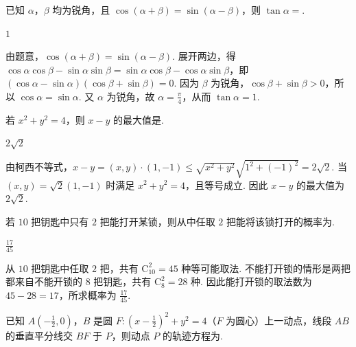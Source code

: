 \begin{problem}
已知 \(\alpha\)，\(\beta\) 均为锐角，且 \(\cos (\alpha + \beta) = \sin (\alpha - \beta)\)，则 \(\tan \alpha = \)\fillinblank{}.
\end{problem}

\begin{answer}
\(1\)
\end{answer}

\begin{solution}
由题意，\(\cos(\alpha+\beta)=\sin(\alpha-\beta)\). 展开两边，得 \(\cos\alpha\cos\beta-\sin\alpha\sin\beta=\sin\alpha\cos\beta-\cos\alpha\sin\beta\)，即 \((\cos\alpha-\sin\alpha)(\cos\beta+\sin\beta)=0\). 因为 \(\beta\) 为锐角，\(\cos\beta+\sin\beta>0\)，所以 \(\cos\alpha=\sin\alpha\). 又 \(\alpha\) 为锐角，故 \(\alpha=\frac\pi4\)，从而 \(\tan\alpha=1\).
\end{solution}

\begin{problem}
若 \(x^{2} + y^{2} = 4\)，则 \(x - y\) 的最大值是\fillinblank{}.
\end{problem}

\begin{answer}
\(2\sqrt{2}\)
\end{answer}

\begin{solution}
由柯西不等式，\(x-y=(x,y)\cdot(1,-1)\leqslant\sqrt{x^2+y^2}\sqrt{1^2+(-1)^2}=2\sqrt{2}\). 当 \((x,y)=\sqrt{2}(1,-1)\) 时满足 \(x^2+y^2=4\)，且等号成立. 因此 \(x-y\) 的最大值为 \(2\sqrt{2}\).
\end{solution}

\begin{problem}
若 \(10\) 把钥匙中只有 \(2\) 把能打开某锁，则从中任取 \(2\) 把能将该锁打开的概率为\fillinblank{}.
\end{problem}

\begin{answer}
\(\frac{17}{45}\)
\end{answer}

\begin{solution}
从 \(10\) 把钥匙中任取 \(2\) 把，共有 \(\mathrm C_{10}^2=45\) 种等可能取法. 不能打开锁的情形是两把都来自不能开锁的 \(8\) 把钥匙，共有 \(\mathrm C_8^2=28\) 种. 因此能打开锁的取法数为 \(45-28=17\)，所求概率为 \(\frac{17}{45}\).
\end{solution}

\begin{problem}
已知 \(A\left(-\frac{1}{2},0\right)\)，\(B\) 是圆 \(F:\left(x - \frac{1}{2}\right)^2 + y^2 = 4\)（\(F\) 为圆心）上一动点，线段 \(AB\) 的垂直平分线交 \(BF\) 于 \(P\)，则动点 \(P\) 的轨迹方程为\fillinblank{}.
\end{problem}


